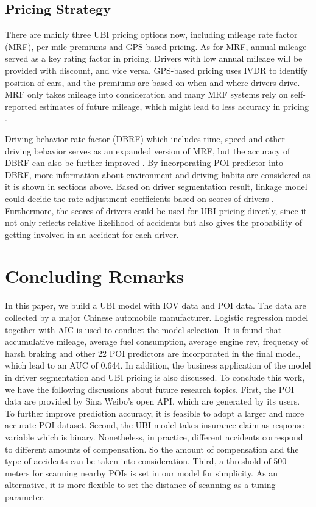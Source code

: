 \documentclass[sii]{ipart}
\theoremstyle{plain}
\begin{document}
\subsection{Pricing Strategy}
There are mainly three UBI pricing options now, including mileage rate factor (MRF), per-mile premiums and GPS-based pricing. As for MRF, annual mileage served as a key rating factor in pricing. Drivers with low annual mileage will be provided with discount, and vice versa. GPS-based pricing uses IVDR to identify position of cars, and the premiums are based on when and where drivers drive. MRF only takes mileage into consideration and many MRF systems rely on self-reported estimates of future mileage, which might lead to less accuracy in pricing \cite{litman2008pay}.

Driving behavior rate factor (DBRF) which includes time, speed and other driving behavior serves as an expanded version of MRF, but the accuracy of DBRF can also be further improved \cite{liu2017risky}. By incorporating POI predictor into DBRF, more information about environment and driving habits are considered as it is shown in sections above. Based on driver segmentation result, linkage model could decide the rate adjustment coefficients based on scores of drivers \cite{liu2017risky}. Furthermore, the scores of drivers could be used for UBI pricing directly, since it not only reflects relative likelihood of accidents but also gives the probability of getting involved in an accident for each driver. 

\section{Concluding Remarks}
In this paper, we build a UBI model with IOV data and POI data. The data are collected by a major Chinese automobile manufacturer. Logistic regression model together with AIC is used to conduct the model selection. It is found that accumulative mileage, average fuel consumption, average engine rev, frequency of harsh braking and other 22 POI predictors are incorporated in the final model, which lead to an AUC of 0.644. In addition, the business application of the model in driver segmentation and UBI pricing is also discussed. To conclude this work, we have the following discussions about future research topics. First, the POI data are provided by Sina Weibo's open API, which are generated by its users. To further improve prediction accuracy, it is feasible to adopt a larger and more accurate POI dataset. Second, the UBI model takes insurance claim as response variable which is binary. Nonetheless, in practice, different accidents correspond to different amounts of compensation. So the amount of compensation and the type of accidents can be taken into consideration. Third, a threshold of 500 meters for scanning nearby POIs is set in our model for simplicity. As an alternative, it is more flexible to set the distance of scanning as a tuning parameter.



\newpage
	
 
\end{document}

